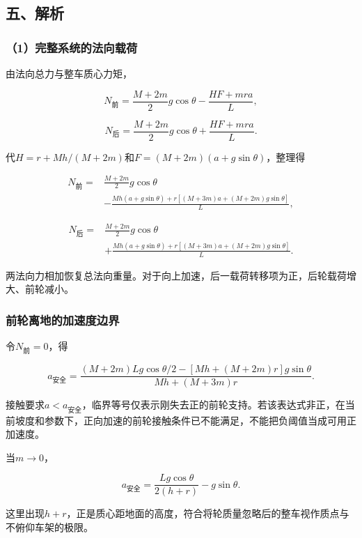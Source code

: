 \documentclass[12pt,a4paper,fontset=fandol]{ctexart}
\begin{document}
\subsection{五、解析}\label{ux4e94ux89e3ux6790-6}

\subsubsection{（1）完整系统的法向载荷}\label{ux5b8cux6574ux7cfbux7edfux7684ux6cd5ux5411ux8f7dux8377}

由法向总力与整车质心力矩，

\[
N_{\text{前}}=\frac{M+2m}{2}g\cos\theta-\frac{HF+mra}{L},
\]

\[
N_{\text{后}}=\frac{M+2m}{2}g\cos\theta+\frac{HF+mra}{L}.
\]

代\(H=r+Mh/(M+2m)\)和\(F=(M+2m)(a+g\sin\theta)\)，整理得

\[
\boxed{
\begin{aligned}
N_{\text{前}}
={}&\frac{M+2m}{2}g\cos\theta\\
&-\frac{Mh(a+g\sin\theta)
+r[(M+3m)a+(M+2m)g\sin\theta]}L,
\end{aligned}}
\]

\[
\boxed{
\begin{aligned}
N_{\text{后}}
={}&\frac{M+2m}{2}g\cos\theta\\
&+\frac{Mh(a+g\sin\theta)
+r[(M+3m)a+(M+2m)g\sin\theta]}L.
\end{aligned}}
\]

两法向力相加恢复总法向重量。对于向上加速，后一载荷转移项为正，后轮载荷增大、前轮减小。

\subsubsection{前轮离地的加速度边界}\label{ux524dux8f6eux79bbux5730ux7684ux52a0ux901fux5ea6ux8fb9ux754c}

令\(N_{\text{前}}=0\)，得

\[
\boxed{
a_{\text{安全}}=
\frac{(M+2m)Lg\cos\theta/2
-[Mh+(M+2m)r]g\sin\theta}
{Mh+(M+3m)r}}.
\]

接触要求\(a<a_{\text{安全}}\)，临界等号仅表示刚失去正的前轮支持。若该表达式非正，在当前坡度和参数下，正向加速的前轮接触条件已不能满足，不能把负阈值当成可用正加速度。

当\(m\to0\)，

\[
\boxed{
a_{\text{安全}}=\frac{Lg\cos\theta}{2(h+r)}-g\sin\theta}.
\]

这里出现\(h+r\)，正是质心距地面的高度，符合将轮质量忽略后的整车视作质点与不俯仰车架的极限。
\end{document}
